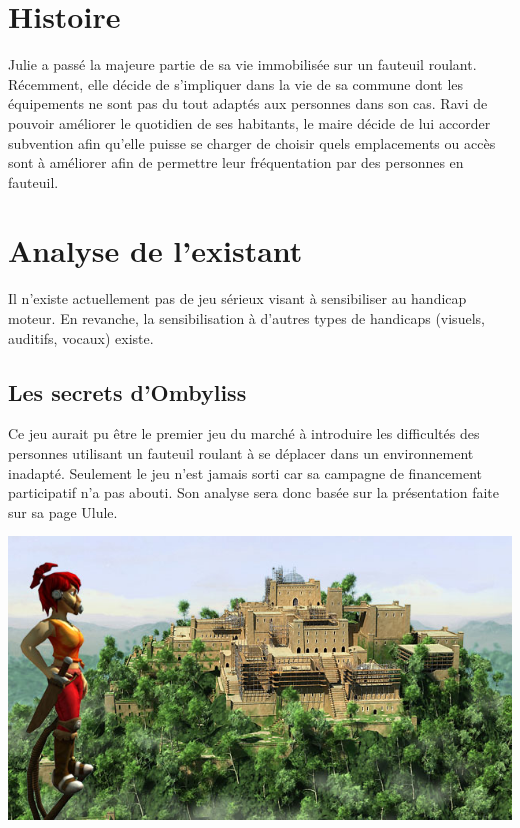 \documentclass[a4paper,11pt]{article}
\begin{document}
\section{Histoire}
Julie a passé la majeure partie de sa vie immobilisée sur un fauteuil roulant. Récemment, elle décide de s’impliquer dans la vie de sa commune dont les équipements ne sont pas du tout adaptés aux personnes dans son cas. Ravi de pouvoir améliorer le quotidien de ses habitants, le maire décide de lui accorder subvention afin qu’elle puisse se charger de choisir quels emplacements ou accès sont à améliorer afin de permettre leur fréquentation par des personnes en fauteuil.

\section{Analyse de l'existant}

Il n’existe actuellement pas de jeu sérieux visant à sensibiliser au handicap moteur. En revanche, la sensibilisation à d’autres types de handicaps (visuels, auditifs, vocaux) existe.

\subsection{Les secrets d'Ombyliss}

Ce jeu aurait pu être le premier jeu du marché à introduire les difficultés des personnes utilisant un fauteuil roulant à se déplacer dans un environnement inadapté. Seulement le jeu n’est jamais sorti car sa campagne de financement participatif n’a pas abouti. Son analyse sera donc basée sur la présentation faite sur sa page Ulule.

\begin{center}
\includegraphics[scale=0.45]{./fig/jeu1.png}
\end{center}
\end{document}

